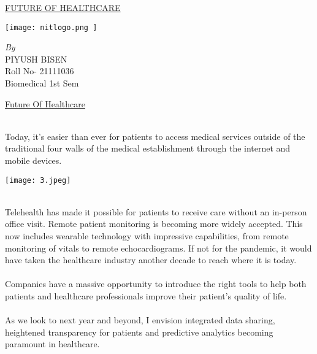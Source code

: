 \documentclass[12pt]{article}
\begin{document}
\begin{center}
\huge\underline{FUTURE OF HEALTHCARE}
\end{center}
\begin{center}
 \texttt{[image: nitlogo.png ]}
\end{center}
\vspace{1cm}
\begin{center}
   \emph{\large By}\\
\Large{ PIYUSH BISEN }\\
\large{Roll No- 21111036}\\
\large{Biomedical 1st Sem}\\
\end{center}
\begin{center}
\newpage
\huge{\underline{Future Of Healthcare}}
\end{center}
\\
Today, it's easier than ever for patients to access medical services outside of the traditional four walls of the medical establishment through the internet and mobile devices.
\\
\begin{center}
\texttt{[image: 3.jpeg]}
\end{center}
\\
Telehealth has made it possible for patients to receive care without an in-person office visit. Remote patient monitoring is becoming more widely accepted. This now includes wearable technology with impressive capabilities, from remote monitoring of vitals to remote echocardiograms. If not for the pandemic, it would have taken the healthcare industry another decade to reach where it is today.
\\
\\
Companies have a massive opportunity to introduce the right tools to help both patients and healthcare professionals improve their patient's quality of life.
\\
\\
As we look to next year and beyond, I envision integrated data sharing, heightened transparency for patients and predictive analytics becoming paramount in healthcare.
\end{document}
